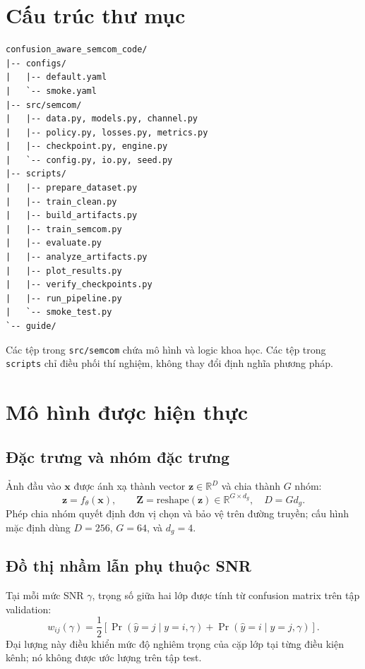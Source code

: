 \documentclass[11pt,journal,onecolumn]{IEEEtran}
\newcommand{\vect}[1]{\boldsymbol{#1}}
\newcommand{\mat}[1]{\boldsymbol{#1}}
\begin{document}
\section{Cấu trúc thư mục}
\begin{lstlisting}
confusion_aware_semcom_code/
|-- configs/
|   |-- default.yaml
|   `-- smoke.yaml
|-- src/semcom/
|   |-- data.py, models.py, channel.py
|   |-- policy.py, losses.py, metrics.py
|   |-- checkpoint.py, engine.py
|   `-- config.py, io.py, seed.py
|-- scripts/
|   |-- prepare_dataset.py
|   |-- train_clean.py
|   |-- build_artifacts.py
|   |-- train_semcom.py
|   |-- evaluate.py
|   |-- analyze_artifacts.py
|   |-- plot_results.py
|   |-- verify_checkpoints.py
|   |-- run_pipeline.py
|   `-- smoke_test.py
`-- guide/
\end{lstlisting}

Các tệp trong \texttt{src/semcom} chứa mô hình và logic khoa học. Các tệp trong \texttt{scripts} chỉ điều phối thí nghiệm, không thay đổi định nghĩa phương pháp.

\section{Mô hình được hiện thực}
\subsection{Đặc trưng và nhóm đặc trưng}
Ảnh đầu vào $\vect{x}$ được ánh xạ thành vector $\vect{z}\in\mathbb{R}^{D}$ và chia thành $G$ nhóm:
\begin{equation}
\vect{z}=f_{\theta}(\vect{x}),\qquad
\mat{Z}=\mathrm{reshape}(\vect{z})\in\mathbb{R}^{G\times d_g},
\quad D=Gd_g.
\end{equation}
Phép chia nhóm quyết định đơn vị chọn và bảo vệ trên đường truyền; cấu hình mặc định dùng $D=256$, $G=64$, và $d_g=4$.

\subsection{Đồ thị nhầm lẫn phụ thuộc SNR}
Tại mỗi mức SNR $\gamma$, trọng số giữa hai lớp được tính từ confusion matrix trên tập validation:
\begin{equation}
w_{ij}(\gamma)=\frac{1}{2}\left[
\Pr(\hat y=j\mid y=i,\gamma)+
\Pr(\hat y=i\mid y=j,\gamma)
\right].
\end{equation}
Đại lượng này điều khiển mức độ nghiêm trọng của cặp lớp tại từng điều kiện kênh; nó không được ước lượng trên tập test.
\end{document}

